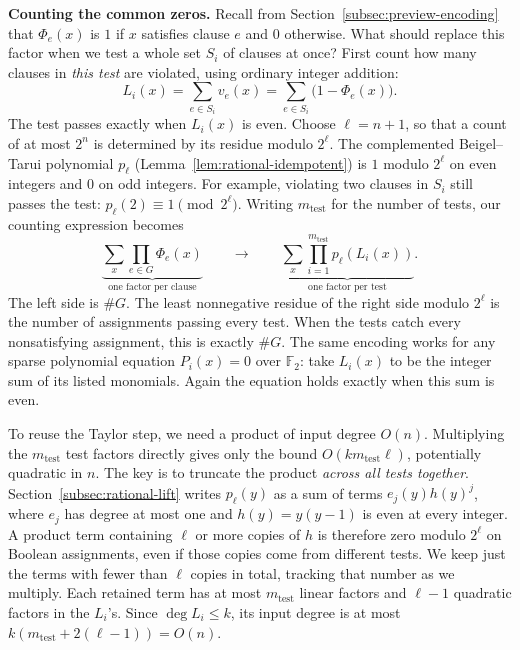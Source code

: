 \documentclass[11pt,reqno]{amsart}
\numberwithin{equation}{section}
\theoremstyle{definition}\newtheorem{definition}[theorem]{Definition}
\theoremstyle{remark}\newtheorem{remark}[theorem]{Remark}
\renewcommand{\le}{\leqslant}
\begin{document}
\medskip\noindent
\textbf{Counting the common zeros.}
Recall from Section~\ref{subsec:preview-encoding} that $\Phi_e(x)$ is
$1$ if $x$ satisfies clause $e$ and $0$ otherwise. What should replace
this factor when we test a whole set $S_i$ of clauses at once? First
count how many clauses in \emph{this test} are violated, using ordinary
integer addition:
\[
 L_i(x)=\sum_{e\in S_i}v_e(x)=\sum_{e\in S_i}\bigl(1-\Phi_e(x)\bigr).
\]
The test passes exactly when $L_i(x)$ is even. Choose $\ell=n+1$, so
that a count of at most $2^n$ is determined by its residue modulo
$2^\ell$. The complemented Beigel--Tarui polynomial $p_\ell$
(Lemma~\ref{lem:rational-idempotent}) is $1$ modulo $2^\ell$ on even
integers and $0$ on odd integers. For example, violating two clauses
in $S_i$ still passes the test: $p_\ell(2)\equiv1\pmod{2^\ell}$.
Writing $m_{\mathrm{test}}$ for the number of tests, our counting expression becomes
\[
 \underbrace{\sum_x\prod_{e\in G}\Phi_e(x)}_{\text{one factor per clause}}
 \qquad\longrightarrow\qquad
 \underbrace{\sum_x\prod_{i=1}^{m_{\mathrm{test}}} p_\ell(L_i(x))}_{\text{one factor per test}}.
\]
The left side is $\#G$. The least nonnegative residue of the right
side modulo $2^\ell$ is the number of assignments passing every test.
When the tests catch every nonsatisfying assignment, this is exactly
$\#G$. The same encoding works for
any sparse polynomial equation $P_i(x)=0$ over $\mathbb F_2$: take
$L_i(x)$ to be the integer sum of its listed monomials. Again the
equation holds exactly when this sum is even.

To reuse the Taylor step, we need a product of input degree $O(n)$.
Multiplying the $m_{\mathrm{test}}$ test factors directly gives only the bound
$O(km_{\mathrm{test}}\ell)$, potentially quadratic in $n$. The key is to truncate
the product \emph{across all tests together}. Section~\ref{subsec:rational-lift}
writes $p_\ell(y)$ as a sum of terms $e_j(y)h(y)^j$, where
$e_j$ has degree at most one and $h(y)=y(y-1)$ is even at every
integer. A product term containing $\ell$ or more copies of $h$ is
therefore zero modulo $2^\ell$ on Boolean assignments, even if those
copies come from different tests. We keep just the terms with fewer
than $\ell$ copies in total, tracking that number as we multiply.
Each retained term has at most $m_{\mathrm{test}}$ linear factors and $\ell-1$
quadratic factors in the $L_i$'s. Since $\deg L_i\le k$, its input
degree is at most $k(m_{\mathrm{test}}+2(\ell-1))=O(n)$.
\end{document}
